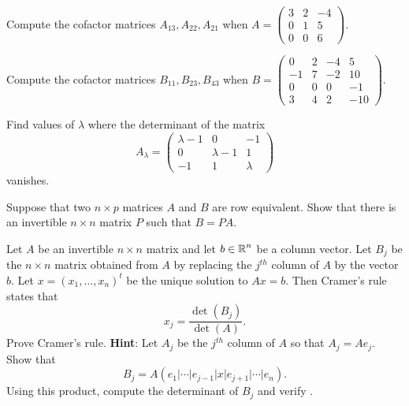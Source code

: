 \documentclass{ximera}
\begin{document}
\begin{exercise} \label{c10.1.b7a}
Compute the cofactor matrices $A_{13}, A_{22}, A_{21}$ when 
$A = \left( \begin{array}{rrr}
 3 & 2 & -4\\
 0 & 1 & 5\\
 0 & 0 & 6\end{array} \right)$.
\end{exercise}
\begin{exercise} \label{c10.1.b7b}
Compute the cofactor matrices $B_{11}, B_{23}, B_{43}$ when
$B = \left( \begin{array}{rrrr}
 0 & 2 & -4 & 5\\
 -1 & 7 & -2 & 10\\
 0 & 0 & 0  & -1\\
3 & 4 & 2 & -10
\end{array} \right)$.
\end{exercise}

\begin{exercise} \label{c10.1.c7}
Find values of $\lambda$ where the determinant of the matrix
\[
A_\lambda = \left( \begin{array}{ccr}
 \lambda -1 & 0 & -1\\
 0 & \lambda -1 & 1\\
-1 & 1 & \lambda 
\end{array} \right)
\]
vanishes.  
\end{exercise}

\begin{exercise}  \label{c10.1.c8} 
Suppose that two $n\times p$ matrices $A$ and $B$ are row
equivalent.  Show that there is an invertible
$n\times n$ matrix $P$ such that $B = PA$.
\end{exercise}

\begin{exercise} \label{c10.1.c9}
Let $A$ be an invertible $n\times n$ matrix and let $b\in\mbox{$\Bbb{R}$}^n$ be a column 
vector. Let $B_j$ be the $n\times n$ matrix obtained from $A$ by replacing the 
$j^{th}$ column of $A$ by the vector $b$.  Let $x=(x_1,\ldots,x_n)^t$ be the 
unique solution to $Ax=b$. Then Cramer's rule  states that
\begin{equation}  \label{E:cramer2}
x_j = \frac{\det(B_j)}{\det(A)}.
\end{equation}
Prove Cramer's rule.  {\bf Hint}: Let $A_j$ be the $j^{th}$ column of $A$ so
that $A_j = Ae_j$.  Show that 
\[
B_j = A (e_1|\cdots|e_{j-1}|x|e_{j+1}|\cdots|e_n).
\]
Using this product, compute the determinant of $B_j$ and verify .
\end{exercise}
\end{document}
